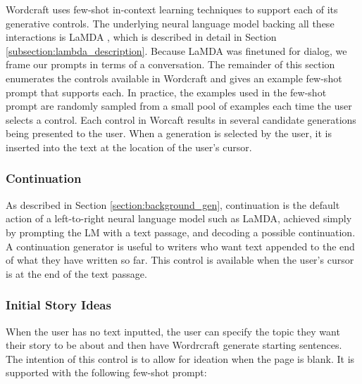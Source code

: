 Wordcraft uses few-shot in-context learning techniques \cite{brown2020language} to support each of its generative controls.
The underlying neural language model backing all these interactions is LaMDA \cite{thoppilan2022lamda}, which is described in detail in Section \ref{subsection:lambda_description}.
Because LaMDA was finetuned for dialog, we frame our prompts in terms of a conversation.
The remainder of this section enumerates the controls available in Wordcraft and gives an example few-shot prompt that supports each.
In practice, the examples used in the few-shot prompt are randomly sampled from a small pool of examples each time the user selects a control.
Each control in Worcaft results in several candidate generations being presented to the user.
When a generation is selected by the user, it is inserted into the text at the location of the user's cursor.


\subsubsection{Continuation}
As described in Section \ref{section:background_gen}, continuation is the default action of a left-to-right neural language model such as LaMDA, achieved simply by prompting the LM with a text passage, and decoding a possible continuation.
A continuation generator is useful to writers who want text appended to the end of what they have written so far.
This control is available when the user's cursor is at the end of the text passage.

\subsubsection{Initial Story Ideas}
When the user has no text inputted, the user can specify the topic they want their story to be about and then have Wordrcraft generate starting sentences.
The intention of this control is to allow for ideation when the page is blank.
It is supported with the following few-shot prompt:

